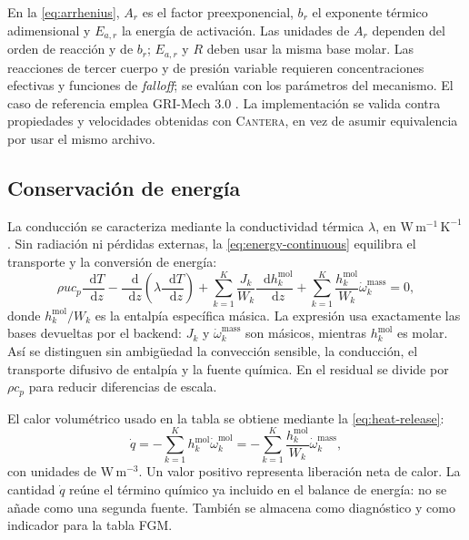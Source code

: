 \documentclass[12pt,a4paper,twoside,openany]{book}
\newcommand{\dd}{\mathop{}\!\mathrm{d}}
\newcommand{\Cantera}{\textsc{Cantera}\xspace}
\begin{document}
En la \cref{eq:arrhenius}, \(A_r\) es el factor preexponencial,
\(b_r\) el exponente térmico adimensional y \(E_{a,r}\) la energía de
activación. Las unidades de \(A_r\) dependen del orden de reacción y de
\(b_r\); \(E_{a,r}\) y \(R\) deben usar la misma base molar.
Las reacciones de tercer cuerpo y de presión variable requieren concentraciones
efectivas y funciones de \emph{falloff}; se evalúan con los parámetros del
mecanismo. El caso de referencia emplea GRI-Mech 3.0
\cite{SmithGRI1999}. La implementación se valida contra propiedades y velocidades
obtenidas con \Cantera, en vez de asumir equivalencia por usar el mismo archivo.

\subsection{Conservación de energía}

La conducción se caracteriza mediante la conductividad térmica
\(\lambda\), en \(\mathrm{W\,m^{-1}\,K^{-1}}\). Sin radiación ni pérdidas
externas, la \cref{eq:energy-continuous} equilibra el transporte y la
conversión de energía:
\begin{equation}
  \rho u c_p\frac{\dd T}{\dd z}
  -\frac{\dd}{\dd z}\left(\lambda\frac{\dd T}{\dd z}\right)
  +\sum_{k=1}^{K}\frac{J_k}{W_k}
  \frac{\dd h_k^{\mathrm{mol}}}{\dd z}
  +\sum_{k=1}^{K}\frac{h_k^{\mathrm{mol}}}{W_k}
  \dot\omega_k^{\mathrm{mass}}=0,
  \label{eq:energy-continuous}
\end{equation}
donde \(h_k^{\mathrm{mol}}/W_k\) es la entalpía específica másica. La expresión
usa exactamente las bases devueltas por el backend: \(J_k\) y
\(\dot\omega_k^{\mathrm{mass}}\) son másicos, mientras
\(h_k^{\mathrm{mol}}\) es molar. Así se distinguen sin ambigüedad la convección
sensible, la conducción, el transporte difusivo de entalpía y la fuente
química. En el residual se divide por \(\rho c_p\) para reducir diferencias de
escala.

El calor volumétrico usado en la tabla se obtiene mediante la \cref{eq:heat-release}:
\begin{equation}
  \dot q=-\sum_{k=1}^{K}h_k^{\mathrm{mol}}
  \dot\omega_k^{\mathrm{mol}}
  =-\sum_{k=1}^{K}\frac{h_k^{\mathrm{mol}}}{W_k}
  \dot\omega_k^{\mathrm{mass}},
  \label{eq:heat-release}
\end{equation}
con unidades de \(\mathrm{W\,m^{-3}}\). Un valor positivo representa
liberación neta de calor. La cantidad \(\dot q\) reúne el término químico ya
incluido en el balance de energía: no se añade como una segunda fuente.
También se almacena como diagnóstico y como indicador para la tabla FGM.
\end{document}
